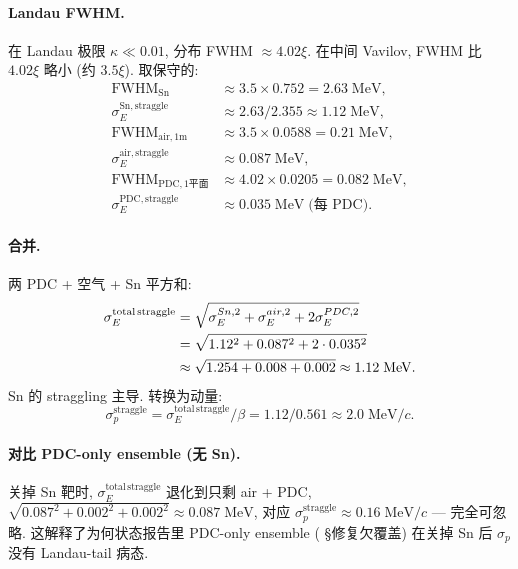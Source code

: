 \paragraph{Landau FWHM.} 在 Landau 极限 $\kappa \ll 0.01$, 分布 FWHM $\approx 4.02\xi$. 在中间 Vavilov, FWHM 比 $4.02\xi$ 略小 (约 $3.5 \xi$). 取保守的:
\begin{align}
  \mathrm{FWHM}_\mathrm{Sn} &\approx 3.5 \times 0.752 = 2.63\;\mathrm{MeV}, \\
  \sigma_E^\mathrm{Sn,straggle} &\approx 2.63 / 2.355 \approx 1.12\;\mathrm{MeV}, \\
  \mathrm{FWHM}_\mathrm{air,1m} &\approx 3.5 \times 0.0588 = 0.21\;\mathrm{MeV}, \\
  \sigma_E^\mathrm{air,straggle} &\approx 0.087\;\mathrm{MeV}, \\
  \mathrm{FWHM}_\mathrm{PDC,1平面} &\approx 4.02 \times 0.0205 = 0.082\;\mathrm{MeV}, \\
  \sigma_E^\mathrm{PDC,straggle} &\approx 0.035\;\mathrm{MeV}\;\text{(每 PDC)}.
\end{align}

\paragraph{合并.} 两 PDC + 空气 + Sn 平方和:
\begin{align}
  \sigma_E^\mathrm{total\,straggle}
  &= \sqrt{\sigma_E^{Sn,2} + \sigma_E^{air,2} + 2\sigma_E^{PDC,2}} \notag\\
  &= \sqrt{1.12^2 + 0.087^2 + 2 \cdot 0.035^2} \notag\\
  &\approx \sqrt{1.254 + 0.008 + 0.002}
  \approx 1.12\;\mathrm{MeV}.
\end{align}
Sn 的 straggling 主导. 转换为动量:
\begin{equation}
  \sigma_p^\mathrm{straggle}
  = \sigma_E^\mathrm{total\,straggle} / \beta
  = 1.12 / 0.561
  \approx 2.0\;\mathrm{MeV}/c.
  \label{eq:partIc:sigma_p_straggle}
\end{equation}

\paragraph{对比 PDC-only ensemble (无 Sn).} 关掉 Sn 靶时, $\sigma_E^\mathrm{total\,straggle}$ 退化到只剩 air + PDC, $\sqrt{0.087^2 + 0.002^2 + 0.002^2} \approx 0.087\;\mathrm{MeV}$, 对应 $\sigma_p^\mathrm{straggle} \approx 0.16\;\mathrm{MeV}/c$ — 完全可忽略. 这解释了为何状态报告里 PDC-only ensemble (\StatusReport{} §修复欠覆盖) 在关掉 Sn 后 $\sigma_p$ 没有 Landau-tail 病态.

